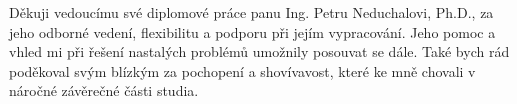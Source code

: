 
\begin{acknowledgements}
\vspace{1cm}
Děkuji vedoucímu své diplomové práce panu Ing. Petru Neduchalovi, Ph.D., za jeho odborné vedení, flexibilitu a podporu při jejím vypracování. Jeho pomoc a vhled mi při řešení nastalých problémů umožnily posouvat se dále. Také bych rád poděkoval svým blízkým za pochopení a shovívavost, které ke mně chovali v náročné závěrečné části studia.

\end{acknowledgements}
